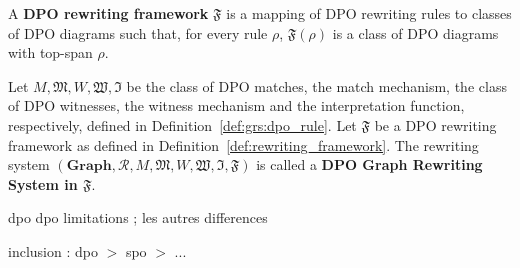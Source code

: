     \begin{definition}
        A \textbf{DPO rewriting framework} $\mathfrak{F}$ is a mapping of DPO rewriting rules to classes of DPO diagrams such that, for every rule $\rho$, $\mathfrak{F}(\rho)$ is a class of DPO diagrams with top-span $\rho$.
      \end{definition}
    

    \begin{definition}
      Let $M, \mathfrak{M}, W, \mathfrak{W}, \mathfrak{I}$ be the class of DPO matches, the match mechanism, the class of DPO witnesses, the witness mechanism and the interpretation function, respectively, defined in Definition~\ref{def:grs:dpo_rule}.
      Let $\mathfrak{F}$ be a DPO rewriting framework as defined in Definition~\ref{def:rewriting_framework}.
      The rewriting system $(\mathbf{Graph}, \mathcal{R}, M, \mathfrak{M}, W, \mathfrak{W}, \mathfrak{I}, \mathfrak{F})$ is called a \textbf{DPO Graph Rewriting System in $\mathfrak{F}$}.
    \end{definition}


    \color{red}    
    
    
    dpo
    dpo limitations ;
    les autres differences
    
    \begin{proposition}[to do]
        inclusion : dpo $>$ spo $>$ ...
    \end{proposition}
    
